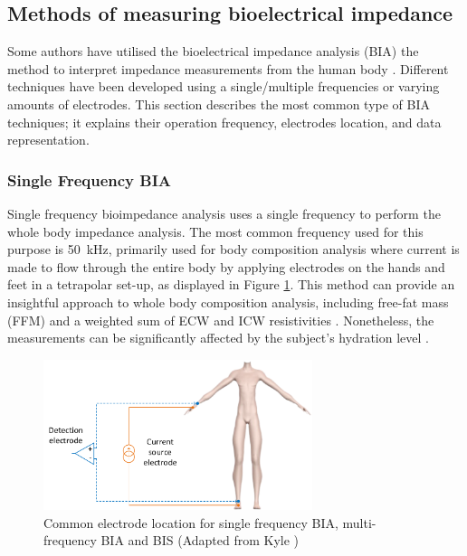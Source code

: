 \subsection{Methods of measuring bioelectrical impedance}
\label{section impedance state art.1}
Some authors have utilised the bioelectrical impedance analysis (BIA) the method to interpret impedance measurements from the human body \cite{kyle2004bioelectrical}. Different techniques have been developed using a single/multiple frequencies or varying amounts of electrodes. This section describes the most common type of BIA techniques; it explains their operation frequency, electrodes location, and data representation.

\subsubsection{Single Frequency BIA}
Single frequency bioimpedance analysis uses a single frequency to perform the whole body impedance analysis. The most common frequency used for this purpose is \SI{50}{\kilo\hertz}, primarily used for body composition analysis where current is made to flow through the entire body by applying electrodes on the hands and feet in a tetrapolar set-up, as displayed in Figure \ref{fig:single f BIA}. This method can provide an insightful approach to whole body composition analysis, including free-fat mass (FFM) and a weighted sum of ECW and ICW resistivities \cite{kyle2004bioelectrical}. Nonetheless, the measurements can be significantly affected by the subject's hydration level \cite{gudivaka1999single,schoeller2000bioelectrical}.

\begin{figure}[!htpb]
	\centering
	\includegraphics[width=0.7\textwidth,keepaspectratio]{figure12}    
	\caption[Common electrodes placement for whole body BIA and BIS]{Common electrode location for single frequency BIA, multi-frequency BIA and BIS (Adapted from Kyle \cite{kyle2004bioelectrical})}
	\label{fig:single f BIA}
\end{figure}

